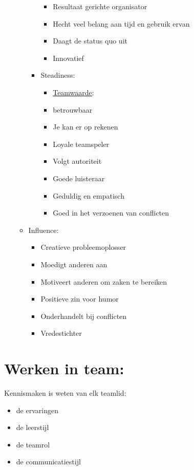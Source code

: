 \documentclass[12pt]{article}
\begin{document}
\begin{itemize}
\begin{itemize}
\begin{itemize}
\begin{itemize}
                \item Resultaat gerichte organisator 
                \item Hecht veel belang aan tijd en gebruik ervan 
                \item Daagt de status quo uit
                \item Innovatief
            \end{itemize}
            \item Steadiness:\begin{itemize}
                \item[]\underline{Teamwaarde}:
                    \item betrouwbaar
                    \item Je kan er op rekenen
                    \item Loyale teamspeler 
                    \item Volgt autoriteit 
                    \item Goede luisteraar 
                    \item Geduldig en empatisch 
                    \item Goed in het verzoenen van conflicten
                \end{itemize}
            \end{itemize}
            \item Influence:\begin{itemize}
                \item Creatieve probleemoplosser 
                \item Moedigt anderen aan 
                \item Motiveert anderen om zaken te bereiken 
                \item Positieve zin voor humor 
                \item Onderhandelt bij conflicten 
                \item Vredestichter
            \end{itemize}
        \end{itemize}
    \end{itemize}
\section{Werken in team:}
Kennismaken is weten van elk teamlid:\begin{itemize}
    \item de ervaringen
    \item de leerstijl
    \item de teamrol
    \item de communicatiestijl
\end{itemize}
\end{document}
